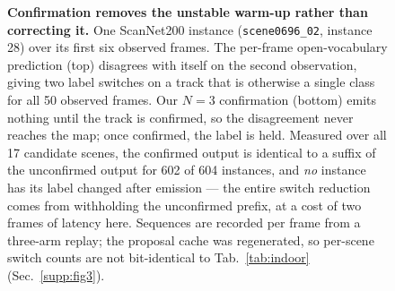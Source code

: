 \begin{figure}[t]
\caption{\textbf{Confirmation removes the unstable warm-up rather than correcting it.}
One ScanNet200 instance (\texttt{scene0696\_02}, instance 28) over its first six observed frames.
The per-frame open-vocabulary prediction (top) disagrees with itself on the second observation, giving two label switches on a track that is otherwise a single class for all 50 observed frames.
Our $N\!=\!3$ confirmation (bottom) emits nothing until the track is confirmed, so the disagreement never reaches the map; once confirmed, the label is held.
Measured over all 17 candidate scenes, the confirmed output is identical to a suffix of the unconfirmed output for 602 of 604 instances, and \emph{no} instance has its label changed after emission --- the entire switch reduction comes from withholding the unconfirmed prefix, at a cost of two frames of latency here.
Sequences are recorded per frame from a three-arm replay; the proposal cache was regenerated, so per-scene switch counts are not bit-identical to Tab.~\ref{tab:indoor} (Sec.~\ref{supp:fig3}).}
\label{fig:semantic_stability}
\end{figure}
